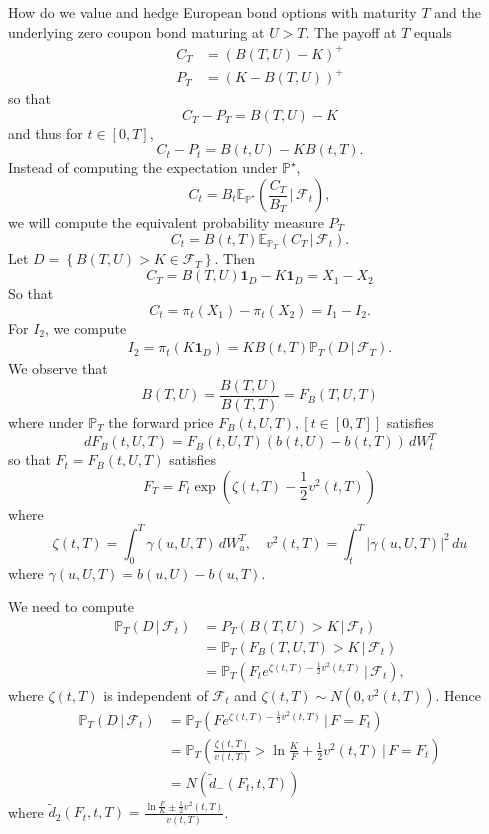 \documentclass[10pt, oneside, reqno]{amsbook}
\theoremstyle{plain}%
\theoremstyle{definition}
\theoremstyle{remark}
\newcommand{\given}{ \, | \,}
\newcommand{\sigf}{\mathcal{F}}
\newcommand{\E}{\mathbb{E}}
\renewcommand{\P}{\mathbb{P}}
\numberwithin{equation}{chapter}
\begin{document}
	How do we value and hedge European bond options with maturity $T$ and the underlying zero coupon bond maturing at $U > T$.  The payoff at $T$ equals \begin{align*}
		C_T &= \left( B(T, U) - K \right)^+ \\
		P_T &= \left( K - B(T, U) \right)^+ 
	\end{align*} so that \[
		C_T - P_T = B(T, U) - K
	\] and thus for $t \in [0, T]$, \[
		C_t - P_t = B(t, U) - KB(t, T). 
	\]  Instead of computing the expectation under $\P^\star$, \[
		C_t = B_t \E_{\P^\star} \left( \frac{C_T}{B_T} \given \sigf_t \right),
	\] we will compute the equivalent probability measure $P_T$ \[
		C_t = B(t, T) \E_{\P_T} \left( C_T \given \sigf_t \right).
	\]  Let $D = \left\{ B(T, U) > K \in \sigf_T \right\}$.  Then \[
		C_T = B(T, U) \mathbf{1}_D - K \mathbf{1}_D = X_1 - X_2
	\] So that \[
		C_t = \pi_t(X_1) - \pi_t(X_2) = I_1 - I_2.
	\]  For $I_2$, we compute \begin{align*}
		I_2 = \pi_t(K \mathbf{1}_D) = K B(t, T) \P_T\left(D \given \sigf_T \right).  
	\end{align*} We observe that \[
		B(T, U) = \frac{B(T, U)}{B(T, T)} = F_B(T, U , T)
	\] where under $\P_T$ the forward price $F_B(t, U, T), [t \in [0, T]]$ satisfies \[
		dF_B(t, U , T) = F_B(t, U, T) \left( b(t, U) - b(t, T) \right) \, dW^T_t
	\] so that $F_t = F_B(t, U, T)$ satisfies \[
		F_T = F_t \exp \left( \zeta(t, T) - \frac{1}{2} v^2( t, T) \right)
	\] where \[
		\zeta(t, T) = \int_0^T \gamma(u, U , T) \, dW^T_u, \quad v^2(t, T) = \int_t^T \left| \gamma(u, U, T) \right|^2 \, du
	\] where $\gamma(u, U, T) = b(u, U) - b(u, T)$.    
	
	We need to compute \begin{align*}
		\P_T(D \given \sigf_t) &= P_T(B(T, U) > K  \given \sigf_t) \\
						&= \P_T ( F_B(T, U, T) > K \given \sigf_t) \\
						&= \P_T \left(F_t e^{\zeta(t, T) - \frac{1}{2} v^2(t, T)} \given \sigf_t \right),
	\end{align*} where $\zeta(t, T)$ is independent of $\sigf_t$ and $\zeta(t, T) \sim N(0, v^2(t, T))$.  Hence \begin{align*}
		\P_T(D \given \sigf_t) &= \P_T \left( F e^{\zeta(t, T) - \frac{1}{2} v^2(t, T)} \given F = F_t \right)  \\
		&= \P_T \left( \frac{\zeta(t, T)}{v(t, T)} > \ln \frac{K}{F} + \frac{1}{2} v^2(t, T) \given F = F_t \right) \\
		&= N( \tilde d_{-}(F_t, t, T))
	\end{align*} where $\tilde d_2(F_t, t, T) = \frac{\ln \frac{F}{K} \pm \frac{1}{2} v^2(t, T)}{v(t, T)}$.  
	
\end{document}
